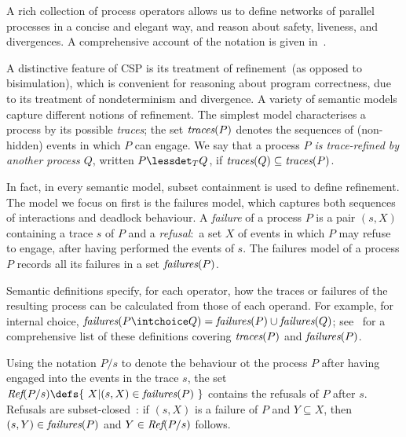 \documentclass[3p,times]{elsarticle}
\newcommand{\trc}{\text{\it traces}}
\newcommand{\fails}{\text{\it failures}}
\newcommand{\refs}{\text{\it Ref}}
\begin{document}
A rich collection of process operators allows us to define networks of
parallel processes in a concise and elegant way, and reason about safety,
liveness, and divergences.  A comprehensive account of the notation is given
in~\cite{Roscoe2010}.

A distinctive feature of CSP is its treatment of refinement~(as opposed to
bisimulation), which is convenient for reasoning about program correctness,
due to its treatment of nondeterminism and divergence.  A variety of semantic
models capture different notions of refinement. The simplest model
characterises a process by its possible \emph{traces}; the set $\trc(P)$
denotes the sequences of (non-hidden) events in which $P$ can engage.  We say
that a process \emph{$P$ is trace-refined by another process $Q$}, written $P
\lessdet_T Q$, if $\trc(Q)\subseteq \trc(P)$.

In fact, in every semantic model, subset containment is used to define refinement. The
model we focus on first is the failures model, which captures both
sequences of interactions and deadlock behaviour. A \emph{failure} of a process $P$
is a pair $(s,X)$ containing a trace $s$ of $P$ and a \emph{refusal}:~a set $X$ of
events in which $P$ may refuse to engage, after having performed the events of
$s$. The failures model of a process $P$ records all its failures in a set
$\fails(P)$.

Semantic definitions specify, for each operator, how the traces or failures
of the resulting process can be calculated from those of each operand. For
example, for internal choice, $\fails(P\intchoice Q) =
\fails(P)\cup\fails(Q)$; see~\cite[p.~210]{Roscoe:1997:TPC:550448} for a
comprehensive list of these definitions covering $\trc(P)$ and $\fails(P)$.

Using the notation $P/s$ to denote the behaviour ot the process $P$ after
having engaged into the events in the trace $s$, the set $\refs(P/s) \defs
\{~X | (s,X) \in \fails(P)~\}$ contains the  refusals of $P$ after $s$.
Refusals are subset-closed~\cite{Hoare:1985:CSP:3921,Roscoe2010}: if $(s,X)$
is a failure of $P$ and $Y\subseteq X$, then $(s,Y)\in\fails(P)$ and
$Y\in\refs(P/s)$ follows.
\end{document}
